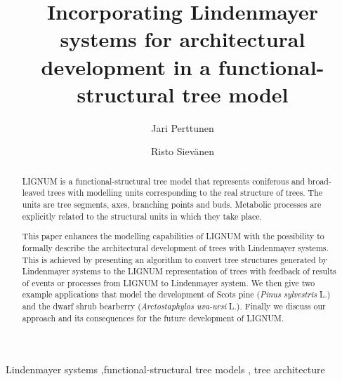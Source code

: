 \documentclass{elsart}
\begin{document}
\begin{frontmatter}


\title{Incorporating Lindenmayer systems for architectural development
in a functional-structural tree model}
\author[Metla]{Jari Perttunen}
\author[Metla]{Risto Siev\"anen}

\address[Metla]{Vantaa   Research  Centre,  Finnish   Forest  Research
Institute, PL 18,  01301 Vantaa, Finland.}




\begin{abstract}
  LIGNUM  is  a   functional-structural  tree  model  that  represents
  coniferous and broad-leaved trees with modelling units corresponding
  to the real structure of  trees.  The units are tree segments, axes,
  branching  points  and  buds.   Metabolic processes  are  explicitly
  related to the structural units in which they take place.
  
  This paper  enhances the modelling  capabilities of LIGNUM  with the
  possibility  to formally describe  the architectural  development of
  trees with  Lindenmayer systems. This  is achieved by  presenting an
  algorithm  to  convert  tree  structures  generated  by  Lindenmayer
  systems  to the  LIGNUM  representation of  trees  with feedback  of
  results of events or processes from LIGNUM to Lindenmayer system. We
  then  give two example  applications that  model the  development of
  Scots  pine  (\textit{Pinus  sylvestris}  L.) and  the  dwarf  shrub
  bearberry (\textit{Arctostaphylos uva-ursi} L.).  Finally we discuss
  our  approach and  its consequences  for the  future  development of
  LIGNUM.

\end{abstract}

\begin{keyword}

 Lindenmayer systems \sep functional-structural tree models \sep 
 tree architecture


\end{keyword}

\end{frontmatter}






\end{document}
